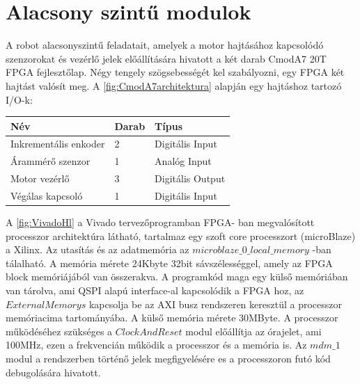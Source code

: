 
\section{Alacsony szintű modulok} 

A robot alacsonyszintű feladatait, amelyek a motor hajtásához kapcsolódó szenzorokat és vezérlő jelek előállítására hivatott a két darab CmodA7 20T FPGA fejlesztőlap. Négy tengely szögsebességét kel szabályozni, egy FPGA két hajtást valósít meg. A \ref{fig:CmodA7architektura} alapján egy hajtáshoz tartozó I/O-k:

\begin{table}[H]
\center
\begin{tabular}{lll}
\hline Név                            & Darab              & Típus  \\ \hline
Inkrementális enkoder           & 2           & Digitális Input \\
Árammérő szenzor                & 1                  & Analóg Input \\
Motor vezérlő                   & 3                  & Digitális Output \\
Végálas kapcsoló                 & 1                  & Digitális Input        
\end{tabular}
\end{table}




\renewcommand{\img}{SajatRobot/SzerkAbrak/cmoda7modulok.jpg}
\renewcommand{\sources}{*}
\renewcommand{\captionn}{CmodA7 FPGA-ban kialakított architektúra amely a szenzorok és motor hajtások kezelésre hivatott }
\renewcommand{\figlabel}{CmodA7architektura}



A \ref{fig:VivadoHl} a Vivado tervezőprogramban FPGA- ban megvalósított processzor architektúra látható, tartalmaz egy szoft core processzort (microBlaze) a Xilinx. Az utasítás és az adatmemória az $microblaze\_0\_local\_memory$ -ban tálalható. A memória mérete 24Kbyte 32bit sávszélességgel, amely az FPGA block memóriájából van összerakva. A programkód maga egy külső memóriában van tárolva, ami QSPI alapú interface-al kapcsolódik a FPGA hoz, az $ExternalMemorys$ kapcsolja be az AXI busz rendszeren keresztül a processzor memóriacima tartományába. A külső memória mérete 30MByte. A processzor működéséhez szükséges a $ClockAndReset$ modul előállítja az órajelet, ami 100MHz, ezen a frekvencián működik a processzor és a memória is. Az $mdm\_1$ modul a rendszerben történő jelek megfigyelésére es a processzoron futó kód debugolására hivatott.

